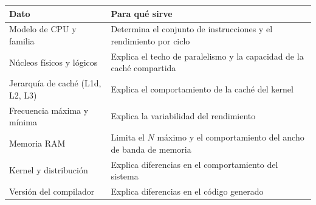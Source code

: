 \begin{center}
\begin{tabular}{|l|p{9cm}|}
\hline
\textbf{Dato} & \textbf{Para qué sirve} \\
\hline
Modelo de CPU y familia & Determina el conjunto de instrucciones y el rendimiento por ciclo \\
Núcleos físicos y lógicos & Explica el techo de paralelismo y la capacidad de la caché compartida \\
Jerarquía de caché (L1d, L2, L3) & Explica el comportamiento de la caché del kernel \\
Frecuencia máxima y mínima & Explica la variabilidad del rendimiento \\
Memoria RAM & Limita el $N$ máximo y el comportamiento del ancho de banda de memoria \\
Kernel y distribución & Explica diferencias en el comportamiento del sistema \\
Versión del compilador & Explica diferencias en el código generado \\
\hline
\end{tabular}
\end{center}
